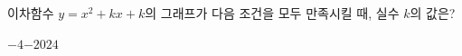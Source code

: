이차함수 $y=x^2+kx+k$의 그래프가 다음 조건을 모두 만족시킬 때, 실수 $k$의 값은? 
\begin{choices32}{$-4$}{$-2$}{$0$}{$2$}{$4$}\end{choices32}
